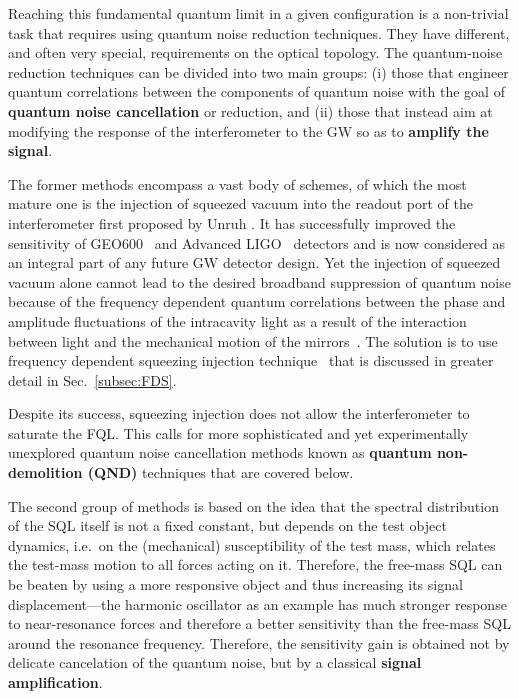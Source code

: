 Reaching this fundamental quantum limit in a given configuration is a non-trivial task that requires using quantum noise reduction techniques. They have different, and often very special, requirements on the optical topology. The quantum-noise reduction techniques can be divided into two main groups: (i) those that engineer quantum correlations between the components of quantum noise with the goal of {\bf quantum noise cancellation} or reduction, and (ii) those that instead aim at modifying the response of the interferometer to the GW so as to {\bf amplify the signal}.

The former methods encompass a vast body of schemes, of which the most mature one is the injection of squeezed vacuum into the readout port of the interferometer first proposed by Unruh \cite{PhysRevD.19.2888}. It has successfully improved the sensitivity of GEO600~\cite{GEOsqueezing} and Advanced LIGO~\cite{Aasi2013NatPhot} detectors and is now considered as an integral part of any future GW detector design. Yet the injection of squeezed vacuum alone cannot lead to the desired broadband suppression of quantum noise because of the frequency dependent quantum correlations between the phase and amplitude fluctuations of the intracavity light as a result of the interaction between light and the mechanical motion of the mirrors~\cite{KLMTV}. The solution is to use frequency dependent squeezing injection technique~\cite{KLMTV} that is discussed in greater detail in Sec.~\ref{subsec:FDS}.

Despite its success, squeezing injection does not allow the interferometer to saturate the FQL. This calls for more sophisticated and yet experimentally unexplored
quantum noise cancellation methods known as {\bf quantum non-demolition (QND)} techniques that are covered below. 

The second group of methods is based on the idea that the spectral distribution of the SQL itself is not a fixed constant, but depends on the test object dynamics, i.e.\ on the (mechanical) susceptibility of the test mass, which relates the test-mass motion to all forces acting on it. Therefore, the free-mass SQL can be beaten by using a more responsive object and thus increasing its signal displacement---the harmonic oscillator as an example has much stronger response to near-resonance forces and therefore a better sensitivity than the free-mass SQL around the resonance frequency. Therefore, the sensitivity gain is obtained not by delicate cancelation of the
quantum noise, but by a classical {\bf signal amplification}. 

